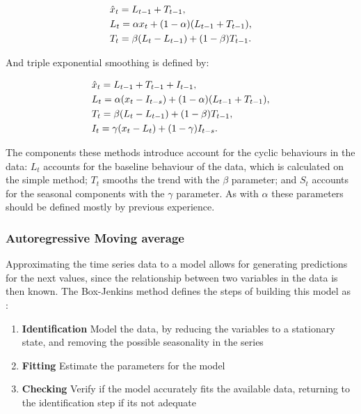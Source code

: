 \begin {equation*}
\centering
\begin {split}
&\hat{x}_t = L_{t-1} + T_{t-1}, \\
&L_t = \alpha x_t + (1-\alpha)(L_{t-1} + T_{t-1}), \\
&T_t = \beta (L_t - L_{t-1}) + (1-\beta)T_{t-1}.
\end {split}
\label{eq:double_exp_smooth}
\end {equation*}

\par And triple exponential smoothing is defined by:

\begin {equation*}
\centering
\begin {split}
&\hat{x}_t = L_{t-1} + T_{t-1} + I_{t-1},\\
&L_t = \alpha (x_t - I_{t-s}) + (1-\alpha)(L_{t-1} + T_{t-1}), \\
&T_t = \beta (L_t - L_{t-1}) + (1-\beta)T_{t-1}, \\
&I_t = \gamma (x_t - L_t) + (1-\gamma)I_{t-s}.
\end {split}
\label{eq:triple_exp_smooth}
\end {equation*}

\par The components these methods introduce account for the cyclic behaviours in the data: $L_t$ accounts for the baseline behaviour of the data, which is 
calculated on the simple method; $T_t$ smooths the trend with the $\beta$ parameter; and $S_t$ accounts for the seasonal components with the $\gamma$ parameter.
As with $\alpha$ these parameters should be defined mostly by previous experience.

\subsubsection{Autoregressive Moving average}

\par Approximating the time series data to a model allows for generating predictions for the next values, since the relationship between two variables in the data is
then known. The Box-Jenkins method defines the steps of building this model as \cite{box_time_2016}:

\begin {enumerate}
  \item \textbf{Identification} Model the data, by reducing the variables to a stationary state, and removing the possible seasonality in the series
  \item \textbf{Fitting} Estimate the parameters for the model
  \item \textbf{Checking} Verify if the model accurately fits the available data, returning to the identification step if its not adequate
\end {enumerate}

